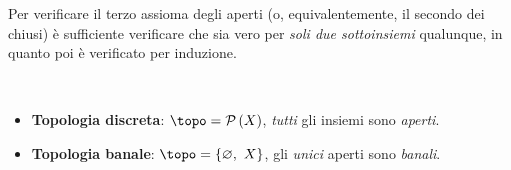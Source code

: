 \begin{observe}
	Per verificare il terzo assioma degli aperti (o, equivalentemente, il secondo dei chiusi) è sufficiente verificare che sia vero per \textit{soli due sottoinsiemi} qualunque, in quanto poi è verificato per induzione.
\end{observe}

\begin{examples}~{}
	\begin{itemize}
		\item \textbf{Topologia discreta}: $\topo=\setpart{X}$, \textit{tutti} gli insiemi sono \textit{aperti}.
		\item \textbf{Topologia banale}: $\topo=\{\emptyset,\ X\}$, gli \textit{unici} aperti sono \textit{banali}.
	\end{itemize}
\vspace{-3mm}
\end{examples}
